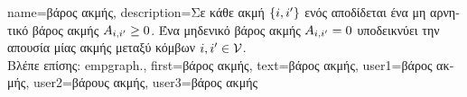{name={\foreignlanguage{greek}{βάρος ακμής}},
	description={\foreignlanguage{greek}{Σε κάθε ακμή $\{i,i'\}$ ενός} 
		 \foreignlanguage{greek}{αποδίδεται ένα μη αρνητικό βάρος ακμής  
		$A_{i,i'}\geq0$. 
		Ένα μηδενικό βάρος ακμής $A_{i,i'}=0$ υποδεικνύει την απουσία  
		μίας ακμής μεταξύ κόμβων} $i, i' \in \mathcal{V}$.\\
		\foreignlanguage{greek}{Βλέπε επίσης:} \gls{empgraph}.}, 
	first={\foreignlanguage{greek}{βάρος ακμής}},
	text={\foreignlanguage{greek}{βάρος ακμής}},
	user1={\foreignlanguage{greek}{βάρος ακμής}}, %
	user2={\foreignlanguage{greek}{βάρους ακμής}}, %
	user3={\foreignlanguage{greek}{βάρος ακμής}} %
}

